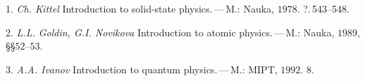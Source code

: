\begin{center}\end{center} {\small

1. \emph{Ch. Kittel} Introduction to solid-state physics.\,---\,M.: Nauka, $1978$. ?.\,543--548.

2. \emph{L.L. Goldin, G.I. Novikova} Introduction to atomic physics.\,---\,M.: Nauka, $1989$, \S\S\;$52$--$53$.

3. \emph{A.A. Ivanov} Introduction to quantum physics.\,---\,M.: MIPT, $1992$. \textsection\;$8$. } 
